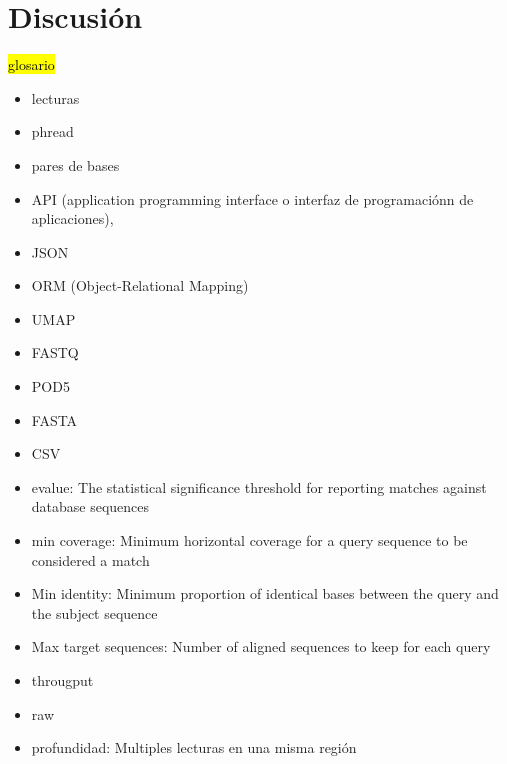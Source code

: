 \chapter{Discusión}

\hl{glosario}
\begin{itemize}
    \item lecturas
    \item phread
    \item pares de bases
    \item API (application programming interface o interfaz de programaciónn de aplicaciones),
    \item JSON
    \item ORM (Object-Relational Mapping)
    \item UMAP
    \item FASTQ
    \item POD5
    \item FASTA
    \item CSV
    \item evalue: The statistical significance threshold for reporting matches against database sequences
    \item min coverage: Minimum horizontal coverage for a query sequence to be considered a match
    \item Min identity: Minimum proportion of identical bases between the query and the subject sequence
    \item Max target sequences: Number of aligned sequences to keep for each query
    \item througput
    \item raw
    \item profundidad: Multiples lecturas en una misma región
\end{itemize}
